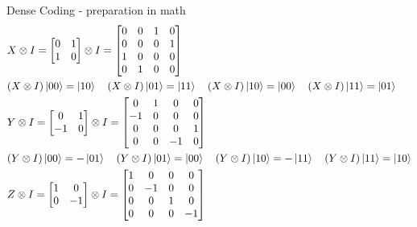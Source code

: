 \documentclass{beamer}
\begin{document}
\begin{frame}{Dense Coding - preparation in math}
    {\tiny
    \begin{align*}
      & X \otimes I =
      \begin{bmatrix} 0 & 1 \\ 1 & 0 \end{bmatrix} 
      \otimes
      I
      =
      \begin{bmatrix}
        0 & 0 & 1 & 0 \\
        0 & 0 & 0 & 1 \\
        1 & 0 & 0 & 0 \\
        0 & 1 & 0 & 0 \\
      \end{bmatrix}
      \\
      & (X \otimes I) \ket{00} = \ket{10}
      \quad
      (X \otimes I) \ket{01} = \ket{11}
      \quad
      (X \otimes I) \ket{10} = \ket{00}
      \quad
      (X \otimes I) \ket{11} = \ket{01}
      \\
      & Y \otimes I =
      \begin{bmatrix} 0 & 1 \\ -1 & 0 \end{bmatrix} 
      \otimes
      I
      =
      \begin{bmatrix}
        0 & 1 & 0 & 0 \\
        -1 & 0 & 0 & 0 \\
        0 & 0 & 0 & 1 \\
        0 & 0 & -1 & 0 \\
      \end{bmatrix}
      \\
      & (Y \otimes I) \ket{00} = -\ket{01}
      \quad
      (Y \otimes I) \ket{01} = \ket{00}
      \quad
      (Y \otimes I) \ket{10} = -\ket{11}
      \quad
      (Y \otimes I) \ket{11} = \ket{10}
      \\
      & Z \otimes I =
      \begin{bmatrix} 1 & 0 \\ 0 & -1 \end{bmatrix} 
      \otimes
      I
      =
      \begin{bmatrix}
        1 & 0 & 0 & 0 \\
        0 & -1 & 0 & 0 \\
        0 & 0 & 1 & 0 \\
        0 & 0 & 0 & -1 \\
      \end{bmatrix}
      \\

\end{align*}}
\end{frame}
\end{document}
